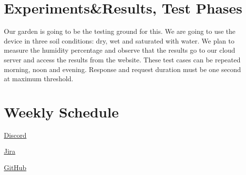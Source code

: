 \documentclass[14pt]{article}
\begin{document}
\section{Experiments\&Results, Test Phases}
Our garden is going to be the testing ground for this. We are going to use the device in three soil conditions: dry, wet and saturated with water. We plan to measure the humidity percentage and observe that the results go to our cloud server and access the results from the website. These test cases can be repeated morning, noon and evening. Response and request duration must be one second at maximum threshold. 
\section{Weekly Schedule}

\href{https://discord.gg/yA3v3fwm}{Discord} 
    
\href{https://eye-tracking-iyte.atlassian.net/jira/software/projects/SHM/boards/2}{Jira} 
    
\href{https://github.com/orgs/SoilHumidityMeter/dashboard}{GitHub} 
\\


\end{document}
